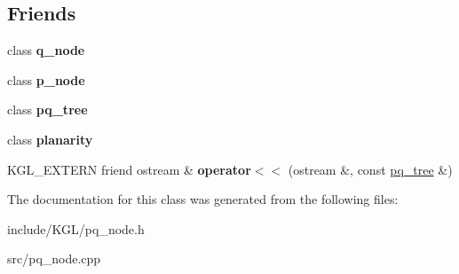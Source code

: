 \subsection*{Friends}
\begin{DoxyCompactItemize}
\item 
\mbox{\label{classpq__node_ab10214fc73d6d72fa7ac390344a4fa46}} 
class {\bfseries q\+\_\+node}
\item 
\mbox{\label{classpq__node_a97e0a0034637eb5933f88c413aa715c6}} 
class {\bfseries p\+\_\+node}
\item 
\mbox{\label{classpq__node_a0a5be4bb438c891059fae98f607f2a9c}} 
class {\bfseries pq\+\_\+tree}
\item 
\mbox{\label{classpq__node_ab6a02224dbc06343d95919289aec77c8}} 
class {\bfseries planarity}
\item 
\mbox{\label{classpq__node_a2e8bee8ed51cc9d2567b69099c4d7cca}} 
K\+G\+L\+\_\+\+E\+X\+T\+E\+RN friend ostream \& {\bfseries operator$<$$<$} (ostream \&, const \mbox{\hyperlink{classpq__tree}{pq\+\_\+tree}} \&)
\end{DoxyCompactItemize}


The documentation for this class was generated from the following files\+:\begin{DoxyCompactItemize}
\item 
include/\+K\+G\+L/pq\+\_\+node.\+h\item 
src/pq\+\_\+node.\+cpp\end{DoxyCompactItemize}
